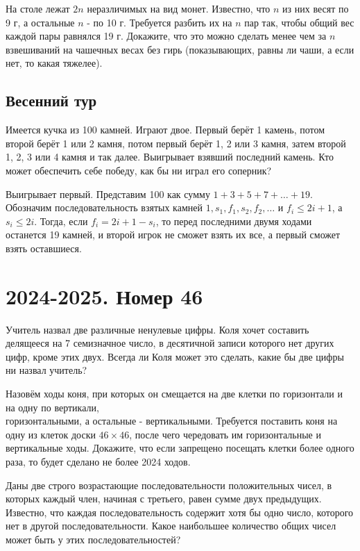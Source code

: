 \documentclass[11pt, a4paper]{common/document_template}
\begin{document}
\begin{exercise}
На столе лежат $2n$ неразличимых на вид монет. Известно, что $n$ из них весят по 9 г, а остальные $n$ - по 10 г. Требуется разбить их на $n$ пар так, чтобы общий вес каждой пары равнялся 19 г. Докажите, что это можно сделать менее чем за $n$ взвешиваний на чашечных весах без гирь (показывающих, равны ли чаши, а если нет, то какая тяжелее).
\end{exercise}

\section{Весенний тур}

\begin{exercise}
Имеется кучка из 100 камней. Играют двое. Первый берёт 1 камень, потом второй берёт 1 или 2 камня, потом первый берёт 1, 2 или 3 камня, затем второй 1, 2, 3 или 4 камня и так далее. Выигрывает взявший последний камень. Кто может обеспечить себе победу, как бы ни играл его соперник?
\end{exercise}

\begin{Solution}
Выигрывает первый. Представим 100 как сумму $1 + 3 + 5 + 7 + \dots + 19$. Обозначим последовательность взятых камней $1, s_{1}, f_{1}, s_{2}, f_{2}, \dots$ и $f_{i} \leqslant 2i + 1$, а $s_{i} \leqslant 2i$. Тогда, если $f_{i} = 2i + 1 - s_{i}$, то перед последними двумя ходами останется 19 камней, и второй игрок не сможет взять их все, а первый сможет взять оставшиеся. 
\end{Solution}


\chapter{2024-2025. Номер 46}

\begin{exercise}
Учитель назвал две различные ненулевые цифры. Коля хочет составить делящееся на 7 семизначное число, в десятичной записи которого нет других цифр, кроме этих двух. Всегда ли Коля может это сделать, какие бы две цифры ни назвал учитель?
\end{exercise}

\begin{exercise}
Назовём ходы коня, при которых он смещается на две клетки по горизонтали и на одну по вертикали, \\ горизонтальными, а остальные - вертикальными. Требуется поставить коня на одну из клеток доски $46 \times 46$, после чего чередовать им горизонтальные и вертикальные ходы. Докажите, что если запрещено посещать клетки более одного раза, то будет сделано не более 2024 ходов.
\end{exercise}

\begin{exercise}
Даны две строго возрастающие последовательности положительных чисел, в которых каждый член, начиная с третьего, равен сумме двух предыдущих. Известно, что каждая последовательность содержит хотя бы одно число, которого нет в другой последовательности. Какое наибольшее количество общих чисел может быть у этих последовательностей?
\end{exercise}
\end{document}
